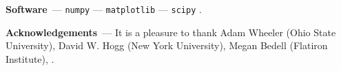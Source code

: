 \documentclass[modern]{aastex631}
\renewcommand{\paragraph}[1]{\medskip\par\noindent\textbf{#1}~---}
\begin{document}

\paragraph{Software}
\texttt{numpy} \citep{numpy} ---
\texttt{matplotlib} \citep{matplotlib} ---
\texttt{scipy} \citep{scipy}.

\paragraph{Acknowledgements}
It is a pleasure to thank
    Adam Wheeler (Ohio State University),
    David W. Hogg (New York University),
    Megan Bedell (Flatiron Institute),
.

%
\end{document}
